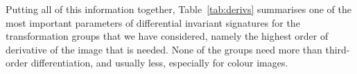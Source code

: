 \documentclass{artjlt}
\begin{document}

Putting all of this information together, Table~\ref{tab:derivs} summarises one of the most important parameters of differential invariant signatures for the transformation groups that we have considered, namely the highest order of derivative of the image that is needed. None of the groups need more than third-order differentiation, and usually less, especially for colour images. 

\end{document}
